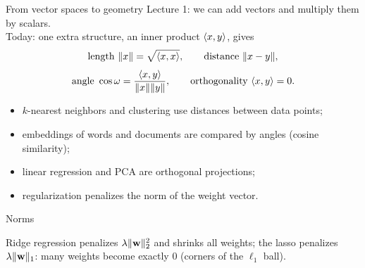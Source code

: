 \documentclass[aspectratio=1610,11pt]{beamer}
\begin{document}
\begin{frame}{From vector spaces to geometry}
    Lecture 1: we can add vectors and multiply them by scalars. \\
    Today: one extra structure, an \alert{inner product} $\langle x, y \rangle$, gives
    \[\text{length } \lVert x \rVert = \sqrt{\langle x, x \rangle}, \qquad \text{distance } \lVert x - y \rVert,\]
    \[\text{angle } \cos\omega = \frac{\langle x, y \rangle}{\lVert x \rVert\lVert y \rVert}, \qquad \text{orthogonality } \langle x, y \rangle = 0.\]
    \begin{mlbox}
        \small
        \begin{itemize}
            \item $k$-nearest neighbors and clustering use distances between data points;
            \item embeddings of words and documents are compared by angles (cosine similarity);
            \item linear regression and PCA are orthogonal projections;
            \item regularization penalizes the norm of the weight vector.
        \end{itemize}
    \end{mlbox}
\end{frame}


\begin{frame}{Norms}
    \begin{mlbox}
        \small Ridge regression penalizes $\lambda\lVert \mathbf{w} \rVert_2^2$ and shrinks all weights; the lasso penalizes $\lambda\lVert \mathbf{w} \rVert_1$: many weights become exactly $0$ (corners of the $\ell_1$ ball).
    \end{mlbox}
\end{frame}
\end{document}
